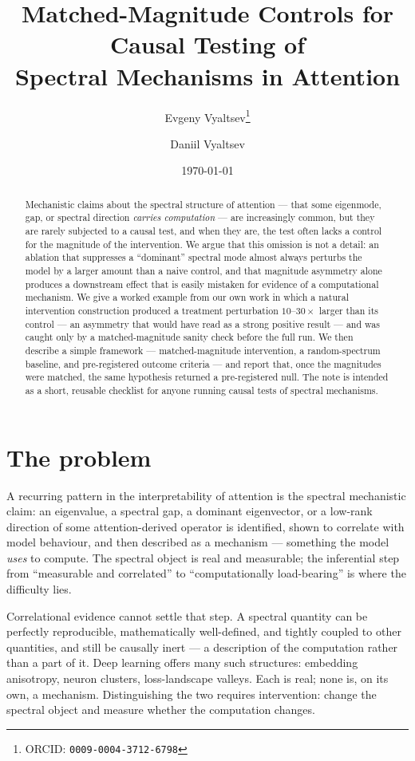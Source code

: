 \documentclass[11pt]{article}
\title{\textbf{Matched-Magnitude Controls for Causal Testing of\\
  Spectral Mechanisms in Attention}}
\author{Evgeny Vyaltsev\thanks{ORCID: \texttt{0009-0004-3712-6798}} \and
        Daniil Vyaltsev}
\date{\today}
\begin{document}
\maketitle

\begin{abstract}
Mechanistic claims about the spectral structure of attention --- that some
eigenmode, gap, or spectral direction \emph{carries computation} --- are
increasingly common, but they are rarely subjected to a causal test, and
when they are, the test often lacks a control for the magnitude of the
intervention. We argue that this omission is not a detail: an ablation
that suppresses a ``dominant'' spectral mode almost always perturbs the
model by a larger amount than a naive control, and that magnitude
asymmetry alone produces a downstream effect that is easily mistaken for
evidence of a computational mechanism. We give a worked example from our
own work in which a natural intervention construction produced a
treatment perturbation $10$--$30\times$ larger than its control --- an
asymmetry that would have read as a strong positive result --- and was
caught only by a matched-magnitude sanity check before the full run. We
then describe a simple framework --- matched-magnitude intervention, a
random-spectrum baseline, and pre-registered outcome criteria --- and
report that, once the magnitudes were matched, the same hypothesis
returned a pre-registered null. The note is intended as a short, reusable
checklist for anyone running causal tests of spectral mechanisms.
\end{abstract}

\section{The problem}
\label{sec:problem}

A recurring pattern in the interpretability of attention is the spectral
mechanistic claim: an eigenvalue, a spectral gap, a dominant eigenvector,
or a low-rank direction of some attention-derived operator is identified,
shown to correlate with model behaviour, and then described as a mechanism
--- something the model \emph{uses} to compute. The spectral object is
real and measurable; the inferential step from ``measurable and
correlated'' to ``computationally load-bearing'' is where the difficulty
lies.

Correlational evidence cannot settle that step. A spectral quantity can be
perfectly reproducible, mathematically well-defined, and tightly coupled
to other quantities, and still be causally inert --- a description of the
computation rather than a part of it. Deep learning offers many such
structures: embedding anisotropy, neuron clusters, loss-landscape valleys.
Each is real; none is, on its own, a mechanism. Distinguishing the two
requires intervention: change the spectral object and measure whether the
computation changes.
\end{document}
